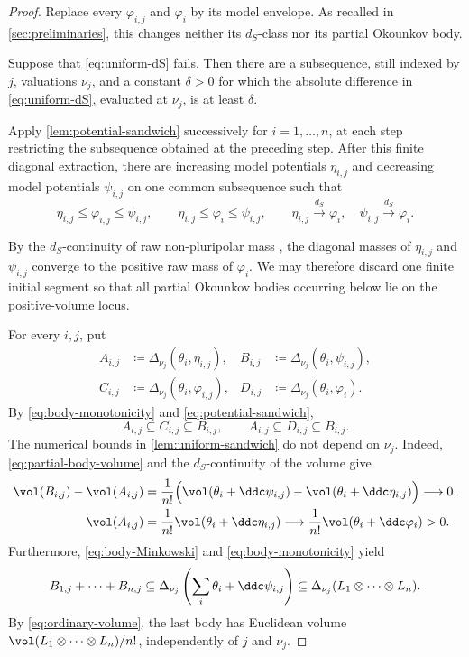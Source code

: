 \documentclass[11pt,a4paper]{amsart}
\newcommand{\dS}{d_{S}}
\begin{document}
\begin{proof}
Replace every $\varphi_{i,j}$ and $\varphi_i$ by its model envelope.  As recalled in \cref{sec:preliminaries}, this changes neither its $\dS$-class nor its partial Okounkov body.

Suppose that \eqref{eq:uniform-dS} fails.  Then there are a subsequence, still indexed by $j$, valuations $\nu_j$, and a constant $\delta>0$ for which the absolute difference in \eqref{eq:uniform-dS}, evaluated at $\nu_j$, is at least $\delta$.

Apply \cref{lem:potential-sandwich} successively for
$i=1,\ldots,n$, at each step restricting the subsequence obtained at the
preceding step.  After this finite diagonal extraction, there are increasing
model potentials $\eta_{i,j}$ and decreasing model potentials $\psi_{i,j}$
on one common subsequence such that
\begin{equation}\label{eq:potential-sandwich}
 \eta_{i,j}\leq\varphi_{i,j}\leq\psi_{i,j},
 \qquad
 \eta_{i,j}\leq\varphi_i\leq\psi_{i,j},
 \qquad
 \eta_{i,j}\xrightarrow{\dS}\varphi_i,
 \quad
 \psi_{i,j}\xrightarrow{\dS}\varphi_i.
\end{equation}

By the $\dS$-continuity of raw non-pluripolar mass
\cite[Corollary~6.2.5]{Xiabook}, the diagonal masses of
$\eta_{i,j}$ and $\psi_{i,j}$ converge to the positive raw mass of
$\varphi_i$.  We may therefore discard one finite initial segment so that
all partial Okounkov bodies occurring below lie on the positive-volume
locus.

For every $i,j$, put
\begin{align*}
 A_{i,j}&\coloneqq \Delta_{\nu_j}(\theta_i,\eta_{i,j}),&
 B_{i,j}&\coloneqq \Delta_{\nu_j}(\theta_i,\psi_{i,j}),\\
 C_{i,j}&\coloneqq \Delta_{\nu_j}(\theta_i,\varphi_{i,j}),&
 D_{i,j}&\coloneqq \Delta_{\nu_j}(\theta_i,\varphi_i).
\end{align*}
By \eqref{eq:body-monotonicity} and \eqref{eq:potential-sandwich},
\[
 A_{i,j}\subseteq C_{i,j}\subseteq B_{i,j},
 \qquad
 A_{i,j}\subseteq D_{i,j}\subseteq B_{i,j}.
\]
The numerical bounds in \cref{lem:uniform-sandwich} do not depend on $\nu_j$. Indeed, \eqref{eq:partial-body-volume} and the $\dS$-continuity of the volume \cite[Corollary~7.3.1]{Xiabook} give
\begin{align*}
 \vol(B_{i,j})-\vol(A_{i,j})
 &=\frac1{n!}\Bigl(\vol(\theta_i+\ddc\psi_{i,j})-\vol(\theta_i+\ddc \eta_{i,j})\Bigr)\longrightarrow 0,\\
 \vol(A_{i,j})
 &=\frac{1}{n!}\vol(\theta_i+\ddc\eta_{i,j})
 \longrightarrow\frac{1}{n!}\vol(\theta_i+\ddc\varphi_i)>0.
\end{align*}
Furthermore, \eqref{eq:body-Minkowski} and \eqref{eq:body-monotonicity} yield
\[
 B_{1,j}+\cdots+B_{n,j}
 \subseteq
 \Delta_{\nu_j}\left(\sum_i\theta_i+\ddc \psi_{i,j}\right)
 \subseteq\Delta_{\nu_j}(L_1\otimes\cdots\otimes L_n).
\]
By \eqref{eq:ordinary-volume}, the last body has Euclidean volume $\vol(L_1\otimes\cdots\otimes L_n)/n!$, independently of $j$ and $\nu_j$.


\end{proof}
\end{document}
